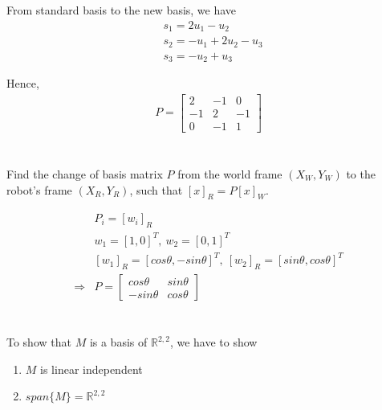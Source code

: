 \documentclass{article}
\theoremstyle{definition} %
\newcommand{\RR}{\mathbb{R}}
\begin{document}
From standard basis to the new basis, we have
\begin{align*}
    &s_1 = 2 u_1 - u_2\\
    &s_2 = - u_1 + 2u_2 - u_3\\
    &s_3 = -u_2 + u_3
\end{align*}

Hence,
\begin{align*}
    P = 
    \begin{bmatrix}
        2 & -1 & 0 \\
        -1 & 2 & -1 \\
        0 & -1 & 1
    \end{bmatrix}
\end{align*}

\section{}
Find the change of basis matrix $P$ from the world frame $(X_W, Y_W)$ to the robot's frame $(X_R, Y_R)$, such that $[x]_R = P[x]_W$.

\begin{align*}
    &P_i = [w_i]_R\\
    &w_1 = [1, 0]^T,\ w_2 = [0, 1]^T\\
    &[w_1]_R = [cos\theta, -sin\theta]^T,\ [w_2]_R = [sin\theta, cos\theta]^T\\
    \Rightarrow
    &P = 
    \begin{bmatrix}
        cos\theta & sin\theta\\
        -sin\theta & cos\theta
    \end{bmatrix}
\end{align*}

\section{}

\subsection{}
To show that $M$ is a basis of $\RR^{2, 2}$, we have to show
\begin{enumerate}[label=(\alph*)]
    \item $M$ is linear independent
    \item $span\{M\}=\RR^{2,2}$
\end{enumerate}
\end{document}
